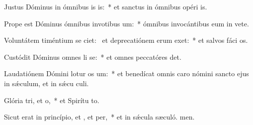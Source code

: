 \item Justus Dóminus in ómnibus is is:~* et sanctus in ómnibus opéri is.
\item Prope est Dóminus ómnibus invotibus um:~* ómnibus invocántibus eum in vete.
\item Voluntátem timéntium se ciet:~\pscross{} et deprecatiónem erum exet:~* et salvos fáci os.
\item Custódit Dóminus omnes li se:~* et omnes peccatóres det.
\item Laudatiónem Dómini lotur os um:~* et benedícat omnis caro nómini sancto ejus in sǽculum, et in sǽcu culi.
\item Glória tri, et o,~* et Spirítu to.
\item Sicut erat in princípio, et , et per,~* et in sǽcula sæculó. men.
